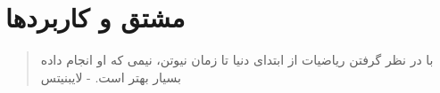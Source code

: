 \chapter{مشتق و کاربردها}
\thispagestyle{empty}

\begin{quote}
	{\lotus
		با در نظر گرفتن ریاضیات از ابتدای دنیا تا زمان نیوتن، نیمی که او انجام داده بسیار بهتر است. \quad - لایبنیتس%
	}
\end{quote}
